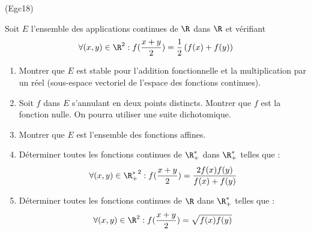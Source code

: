 \begin{tiny}(Egc18)\end{tiny} Soit $E$ l'ensemble des applications continues de $\R$ dans $\R$ et vérifiant
\begin{displaymath}
 \forall (x,y)\in\R^2:
f(\frac{x+y}{2}) = \frac{1}{2}\left(f(x)+f(y) \right) 
\end{displaymath}
\begin{enumerate}
 \item Montrer que $E$ est stable pour l'addition fonctionnelle et la multiplication par un réel (sous-espace vectoriel de l'espace des fonctions continues).
 \item Soit $f$ dans $E$ s'annulant en deux points distincts. Montrer que $f$ est la fonction nulle. On pourra utiliser une suite dichotomique.
 \item Montrer que $E$ est l'ensemble des fonctions affines.
 \item Déterminer toutes les fonctions continues de $\R_+^*$ dans $\R_+^*$ telles que :
\begin{displaymath}
 \forall (x,y)\in {\R_+^*}^2:
f(\frac{x+y}{2})=\frac{2f(x)f(y)}{f(x)+f(y)}
\end{displaymath}
 \item Déterminer toutes les fonctions continues de $\R$ dans $\R_+^*$ telles que :
\begin{displaymath}
 \forall (x,y)\in {\R}^2:
f(\frac{x+y}{2})= \sqrt{f(x)f(y)}
\end{displaymath}

\end{enumerate}
